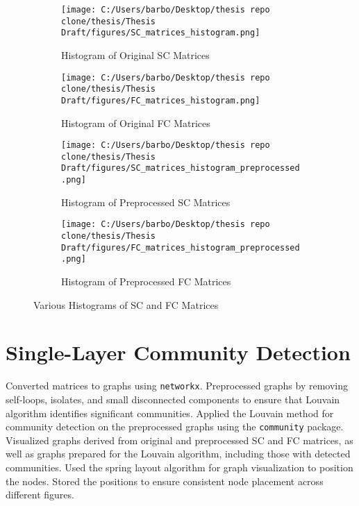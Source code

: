 \begin{figure}[h!]
    \centering
    \begin{subfigure}[b]{0.45\textwidth}
        \texttt{[image: C:/Users/barbo/Desktop/thesis repo clone/thesis/Thesis Draft/figures/SC\_matrices\_histogram.png]}
        \caption{Histogram of Original SC Matrices}
    \end{subfigure}
    \begin{subfigure}[b]{0.45\textwidth}
        \texttt{[image: C:/Users/barbo/Desktop/thesis repo clone/thesis/Thesis Draft/figures/FC\_matrices\_histogram.png]}
        \caption{Histogram of Original FC Matrices}
    \end{subfigure}
    \begin{subfigure}[b]{0.45\textwidth}
        \texttt{[image: C:/Users/barbo/Desktop/thesis repo clone/thesis/Thesis Draft/figures/SC\_matrices\_histogram\_preprocessed.png]}
        \caption{Histogram of Preprocessed SC Matrices}
    \end{subfigure}
    \begin{subfigure}[b]{0.45\textwidth}
        \texttt{[image: C:/Users/barbo/Desktop/thesis repo clone/thesis/Thesis Draft/figures/FC\_matrices\_histogram\_preprocessed.png]}
        \caption{Histogram of Preprocessed FC Matrices}
    \end{subfigure}
    
    \caption{Various Histograms of SC and FC Matrices}
\end{figure}


\section{Single-Layer Community Detection}
Converted matrices to graphs using \texttt{networkx}. 
Preprocessed graphs by removing self-loops, isolates, and small disconnected components to ensure that Louvain algorithm identifies significant communities.
Applied the Louvain method for community detection on the preprocessed graphs using the \texttt{community} package.
Visualized graphs derived from original and preprocessed SC and FC matrices, as well as graphs prepared for the Louvain algorithm, including those with detected communities. 
Used the spring layout algorithm for graph visualization to position the nodes. Stored the positions to ensure consistent node placement across different figures.

